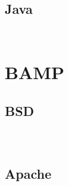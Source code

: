 \section{Java}



\begin{lstlisting}[language=bash]

\end{lstlisting}




\begin{lstlisting}[language=bash]

\end{lstlisting}


\chapter{BAMP}



\section{BSD}


\begin{lstlisting}[language=bash]

\end{lstlisting}





\begin{lstlisting}[language=bash]

\end{lstlisting}



\begin{lstlisting}[language=bash]

\end{lstlisting}



\section{Apache}




\begin{lstlisting}[language=bash]

\end{lstlisting}



\begin{lstlisting}[language=bash]

\end{lstlisting}



